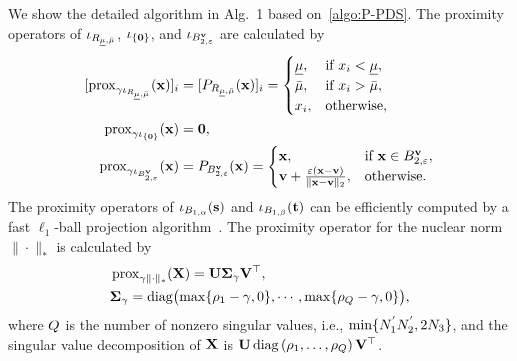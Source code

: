 We show the detailed algorithm in Alg.~1 based on~\eqref{algo:P-PDS}.
The proximity operators of $\iota_{R_{\underline{\mu},\bar{\mu}}}$, $\iota_{\{ \mathbf{0} \}}$, and  $\iota_{B_{2, \varepsilon}^{\mathbf{v}}}$ are calculated by
\begin{align}
	\label{eq:prox_box_constraint}
	\lbrack \operatorname{prox}_{\gamma_{} \iota_{R_{\underline{\mu},\bar{\mu}}}} (\mathbf{x}) \rbrack_{i} 
	&= \lbrack P_{R_{\underline{\mu},\bar{\mu}}} (\mathbf{x}) \rbrack_{i} =
	\begin{cases} 
		\underline{\mu}, & \text{if } x_{i} < \underline{\mu}, \\ 
		\bar{\mu}, & \text{if } x_{i}> \bar{\mu}, \\ 
		x_{i}, & \text{otherwise,} 
	\end{cases} \\
	\label{eq:prox_zeroset}
	\operatorname{prox}_{\gamma \iota_{\{ \mathbf{0} \}}}(\mathbf{x}) &= \mathbf{0}, \\
	\label{eq:prox_l2ball_constraint}
	\operatorname{prox}_{\gamma \iota_{B_{2, \varepsilon}^{\mathbf{v}}}}(\mathbf{x}) &= P_{B_{2, \varepsilon}^{\mathbf{v}}} (\mathbf{x}) = 
	\begin{cases}
		\mathbf{x}, & \text{if } \mathbf{x} \in B_{2, \varepsilon}^{\mathbf{v}}, \\ 
		\mathbf{v} + \frac{\varepsilon (\mathbf{x} - \mathbf{v})}{\| \mathbf{x} - \mathbf{v} \|_2}, & \text{otherwise.}
	\end{cases}
\end{align}
The proximity operators of $\iota_{B_{1, \alpha}} (\mathbf{s})$ and $\iota_{B_{1, \beta}} (\mathbf{t})$ can be efficiently computed by a fast $\ell_{1}$-ball projection algorithm~\cite{Condat2016L1ball}.
The proximity operator for the nuclear norm $\| \cdot \|_{*}$ is calculated by
\begin{align}
	\label{eq:prox_nuclear_norm}
	& \operatorname{prox}_{\gamma_{} \| \cdot \|_{*}} (\mathbf{X}) 
	= \mathbf{U} \mathbf{\Sigma}_{\gamma_{}} \mathbf{V}^{\top}, \notag \\
	& \mathbf{\Sigma}_{\gamma_{}}
	= \operatorname{diag} \bigl( \max \{ \rho_{1} - \gamma_{}, 0\}, \cdots, \max \{ \rho_{Q} - \gamma_{}, 0 \} \bigr),
\end{align}
where $Q$ is the number of nonzero singular values, i.e., $\min \{N_{1}^{'} N_{2}^{'}, 2 N_{3} \}$, and the singular value decomposition of $\mathbf{X}$ is $\mathbf{U} \operatorname{diag} \left( \rho_{1}, \ldots, \rho_{Q} \right) \mathbf{V}^{\top}$.

